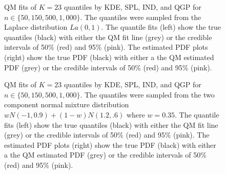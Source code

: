 \documentclass[preprint,12pt,authoryear]{elsarticle}
\begin{document}
\begin{figure}[hbt!]
\centering
  \centering

\caption{QM fits of $K=23$ quantiles by KDE, SPL, IND, and QGP for $n \in \{50, 150, 500, 1{,}000\}$. The quantiles were sampled from the Laplace distribution $La(0,1)$. The quantile fits (left) show the true quantiles (black) with either the QM fit line (grey) or the credible intervals of 50\% (red) and 95\% (pink). 
The estimated PDF plots (right) show the true PDF (black) with either a the QM estimated PDF (grey) or the credible intervals of 50\% (red) and 95\% (pink).}
\label{fig:lp_fits}
\end{figure}


\begin{figure}[hbt!]
\centering
  \centering
\caption{QM fits of $K=23$ quantiles by KDE, SPL, IND, and QGP for $n \in \{50, 150, 500, 1{,}000\}$. The quantiles were sampled from the two component normal mixture distribution $w N(-1, 0.9) + (1-w)N(1.2, .6)$ where $w = 0.35$. The quantile fits (left) show the true quantiles (black) with either the QM fit line (grey) or the credible intervals of 50\% (red) and 95\% (pink). 
The estimated PDF plots (right) show the true PDF (black) with either a the QM estimated PDF (grey) or the credible intervals of 50\% (red) and 95\% (pink). }
\label{fig:gmix_fits}
\end{figure}
\end{document}
